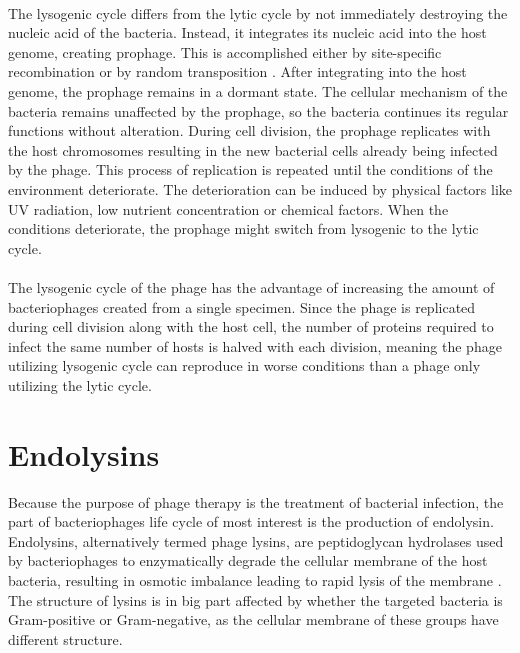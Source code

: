 \paragraph*{}
The lysogenic cycle differs from the lytic cycle by not immediately destroying the nucleic acid of the bacteria. Instead, it integrates its nucleic acid into the host genome, creating prophage. This is accomplished either by site-specific recombination or by random transposition \cite{guttman2005basic}. After integrating into the host genome, the prophage remains in a dormant state. The cellular mechanism of the bacteria remains unaffected by the prophage, so the bacteria continues its regular functions without alteration. During cell division, the prophage replicates with the host chromosomes resulting in the new bacterial cells already being infected by the phage. This process of replication is repeated until the conditions of the environment deteriorate. The deterioration can be induced by physical factors like UV radiation, low nutrient concentration or chemical factors. When the conditions deteriorate, the prophage might switch from lysogenic to the lytic cycle. 
\paragraph*{}
The lysogenic cycle of the phage has the advantage of increasing the amount of bacteriophages created from a single specimen. Since the phage is replicated during cell division along with the host cell, the number of proteins required to infect the same number of hosts is halved with each division, meaning the phage utilizing lysogenic cycle can reproduce in worse conditions than a phage only utilizing the lytic cycle.
\paragraph*{}

\section{Endolysins}
Because the purpose of phage therapy is the treatment of bacterial infection, the part of bacteriophages life cycle of most interest is the production of endolysin. Endolysins, alternatively termed phage lysins, are peptidoglycan hydrolases used by bacteriophages to enzymatically degrade the cellular membrane of the host bacteria, resulting in osmotic imbalance leading to rapid lysis of the membrane \cite{schmelcher2012bacteriophage}. The structure of lysins is in big part affected by whether the targeted bacteria is Gram-positive or Gram-negative, as the cellular membrane of these groups have different structure. 
